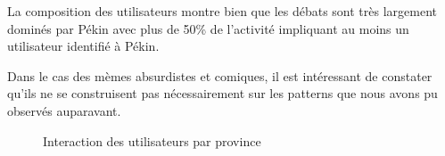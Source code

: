 La composition des utilisateurs montre bien que les d\'ebats sont tr\`es
largement domin\'es par P\'ekin avec plus de 50\% de
l{\textquoteright}activit\'e impliquant au moins un utilisateur
identifi\'e \`a P\'ekin.

Dans le cas des m\`emes absurdistes et comiques, il est int\'eressant de
constater qu{\textquoteright}ils ne se construisent pas
n\'ecessairement sur les patterns que nous avons pu observ\'es
auparavant.

\begin{figure}
    \centering

     

    \caption{
        Interaction des utilisateurs par province
    }

\end{figure}


